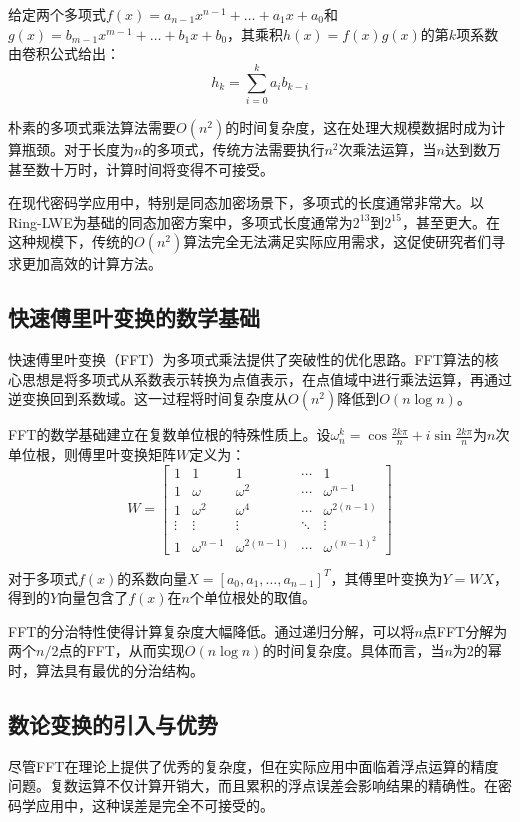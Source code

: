 \documentclass[a4paper]{article}
\begin{document}
给定两个多项式$f(x) = a_{n-1}x^{n-1} + \ldots + a_1x + a_0$和$g(x) = b_{m-1}x^{m-1} + \ldots + b_1x + b_0$，其乘积$h(x) = f(x)g(x)$的第$k$项系数由卷积公式给出：
$$h_k = \sum_{i=0}^{k} a_i b_{k-i}$$

朴素的多项式乘法算法需要$O(n^2)$的时间复杂度，这在处理大规模数据时成为计算瓶颈。对于长度为$n$的多项式，传统方法需要执行$n^2$次乘法运算，当$n$达到数万甚至数十万时，计算时间将变得不可接受。

在现代密码学应用中，特别是同态加密场景下，多项式的长度通常非常大。以Ring-LWE为基础的同态加密方案中，多项式长度通常为$2^{13}$到$2^{15}$，甚至更大。在这种规模下，传统的$O(n^2)$算法完全无法满足实际应用需求，这促使研究者们寻求更加高效的计算方法。

\subsection{快速傅里叶变换的数学基础}

快速傅里叶变换（FFT）为多项式乘法提供了突破性的优化思路。FFT算法的核心思想是将多项式从系数表示转换为点值表示，在点值域中进行乘法运算，再通过逆变换回到系数域。这一过程将时间复杂度从$O(n^2)$降低到$O(n\log n)$。

FFT的数学基础建立在复数单位根的特殊性质上。设$\omega_n^k = \cos\frac{2k\pi}{n} + i\sin\frac{2k\pi}{n}$为$n$次单位根，则傅里叶变换矩阵$W$定义为：
$$W = \begin{bmatrix}
1 & 1 & 1 & \cdots & 1 \\
1 & \omega & \omega^2 & \cdots & \omega^{n-1} \\
1 & \omega^2 & \omega^4 & \cdots & \omega^{2(n-1)} \\
\vdots & \vdots & \vdots & \ddots & \vdots \\
1 & \omega^{n-1} & \omega^{2(n-1)} & \cdots & \omega^{(n-1)^2}
\end{bmatrix}$$

对于多项式$f(x)$的系数向量$X = [a_0, a_1, \ldots, a_{n-1}]^T$，其傅里叶变换为$Y = WX$，得到的$Y$向量包含了$f(x)$在$n$个单位根处的取值。

FFT的分治特性使得计算复杂度大幅降低。通过递归分解，可以将$n$点FFT分解为两个$n/2$点的FFT，从而实现$O(n\log n)$的时间复杂度。具体而言，当$n$为$2$的幂时，算法具有最优的分治结构。

\subsection{数论变换的引入与优势}

尽管FFT在理论上提供了优秀的复杂度，但在实际应用中面临着浮点运算的精度问题。复数运算不仅计算开销大，而且累积的浮点误差会影响结果的精确性。在密码学应用中，这种误差是完全不可接受的。
\end{document}
